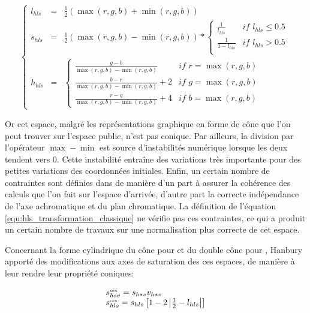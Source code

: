 \begin{equation}{
	\left\{
	\begin{array}{lll}
		l_{hls} & = & \frac{1}{2} \left( \max(r,g,b) + \min(r,g,b) \right) \\
		s_{hls} & = & \frac{1}{2}(\max(r,g,b) - \min(r,g,b)) * \left\{
			\begin{array}{ll}
				\frac{1}{l_{hls}}& \textit{if $l_{hls} \leq 0.5$}\\
				\frac{1}{1-l_{hls}}& \textit{if $l_{hls} > 0.5$}\\
			\end{array}
			\right. \\%
		h_{hls} & = &  \left\{  
			\begin{array}{ll}
				\frac{g-b}{\max(r,g,b) - \min(r,g,b)}     & \textit{if $r = \max(r,g,b)$} \\
				\frac{b-r}{\max(r,g,b) - \min(r,g,b)} + 2 & \textit{if $g = \max(r,g,b)$} \\
				\frac{r-g}{\max(r,g,b) - \min(r,g,b)} + 4 & \textit{if $b = \max(r,g,b)$}	
			\end{array}\right.
	\end{array}
	\right.
	\label{equ:hls_transformation_classique}
}\end{equation}

Or cet espace, malgré les représentations graphique en forme de cône que l'on peut trouver sur l'espace public, n'est pas conique. Par ailleurs, la division par l'opérateur $\max - \min$ est source d'instabilités numérique lorsque les deux tendent vers $0$. Cette instabilité entraîne des variations très importante pour des petites variations des coordonnées initiales. Enfin, un certain nombre de contraintes sont définies dans \cite{angulo_lopez_2003} de manière d'un part à assurer la cohérence des calculs que l'on fait sur l'espace \HLS d'arrivée, d'autre part la correcte indépendance de l'axe achromatique et du plan chromatique. 
La définition de l'équation \ref{equ:hls_transformation_classique} ne vérifie pas ces contraintes, ce qui a produit un certain nombre de travaux sur une normalisation plus correcte de cet espace.

Concernant la forme cylindrique du cône pour  et du double cône pour \HLS , Hanbury \cite{hanbury_taming_2002} apporté des modifications aux axes de saturation des ces espaces, de manière à leur rendre leur propriété coniques:

\begin{equation}
	\begin{array}{ll}
		s_{hsv}^{\textit{\tiny con}} = s_{hsv} v_{hsv}\\
		s_{hls}^{\textit{\tiny con}} = s_{hls} \left[1 - 2 \left|\frac{1}{2} - l_{hls} \right| \right]	
	\end{array}
	\label{equ:modification_saturation}
\end{equation}

